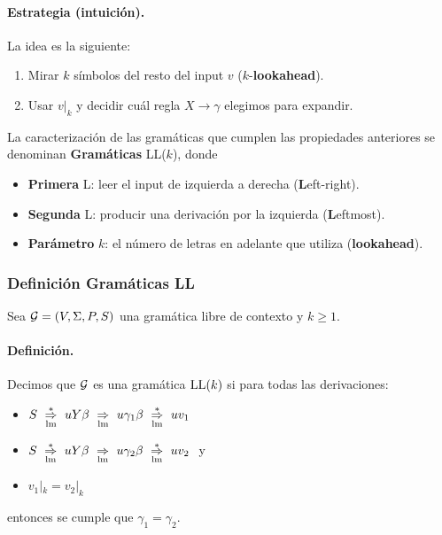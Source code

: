 \paragraph{Estrategia (intuición).} La idea es la siguiente:
\begin{enumerate}
    \item Mirar $k$ símbolos del resto del input $v$ ($k$-\textbf{lookahead}).
    \item Usar $v|_k$ y decidir cuál regla $X\to \gamma$ elegimos para expandir.
\end{enumerate}
La caracterización de las gramáticas que cumplen las propiedades anteriores se denominan \textbf{Gramáticas} LL($k$), donde
\begin{itemize}
    \item \textbf{Primera} L: leer el input de izquierda a derecha (\textbf{L}eft-right).
    \item \textbf{Segunda} L: producir una derivación por la izquierda (\textbf{L}eftmost).
    \item \textbf{Parámetro} $k$: el número de letras en adelante que utiliza (\textbf{lookahead}).
\end{itemize}

\subsubsection{Definición Gramáticas LL}
Sea $\mathcal{G}=(V,\Sigma,P,S)$ una gramática libre de contexto y $k \ge 1$.

\paragraph{Definición.} Decimos que $\mathcal{G}$ es una gramática $\text{LL}(k)$ si para todas las derivaciones:
\begin{itemize}
    \item $S \ \overunder{\Rightarrow}{\mathrm{lm}}{*} \ uY\beta \ \overunder{\Rightarrow}{\mathrm{lm}}{} \ u \gamma_1 \beta \ \overunder{\Rightarrow}{\mathrm{lm}}{*} \ u v_1$
    \item $S \ \overunder{\Rightarrow}{\mathrm{lm}}{*} \ uY\beta \ \overunder{\Rightarrow}{\mathrm{lm}}{} \ u \gamma_2 \beta \ \overunder{\Rightarrow}{\mathrm{lm}}{*} \ u v_2\ $ y
    \item $v_1|_k = v_2|_k$
\end{itemize}
entonces se cumple que $\gamma_1 = \gamma_2$. \medbreak

